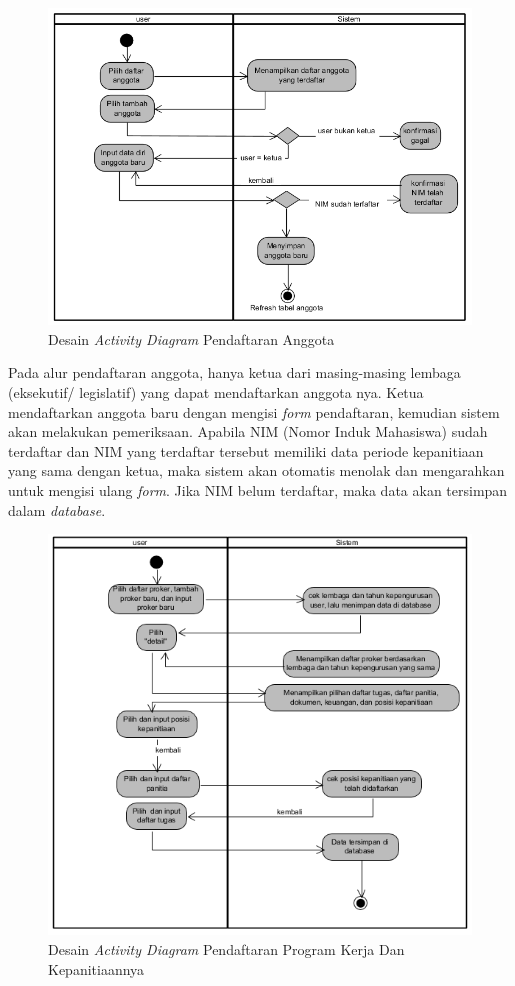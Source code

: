 \begin{figure}[H]
	\centering
	\includegraphics[width=1.0\textwidth]{gambar/Activitytambahanggota}
	\caption{Desain \emph{Activity Diagram} Pendaftaran Anggota}
	\label{activityAnggota_diagram}
\end{figure}

Pada alur pendaftaran anggota, hanya ketua dari masing-masing lembaga (eksekutif/ legislatif) yang dapat mendaftarkan anggota nya. Ketua mendaftarkan anggota baru dengan mengisi \textit{form} pendaftaran, kemudian sistem akan melakukan pemeriksaan. Apabila NIM (Nomor Induk Mahasiswa) sudah terdaftar dan NIM yang terdaftar tersebut memiliki data periode kepanitiaan yang sama dengan ketua, maka sistem akan otomatis menolak dan mengarahkan untuk mengisi ulang \textit{form}. Jika NIM belum terdaftar, maka data akan tersimpan dalam \textit{database}.


\begin{figure}[H]
	\centering
	\includegraphics[width=1.0\textwidth]{gambar/Activityproker}
	\caption{Desain \textit{Activity Diagram} Pendaftaran Program Kerja Dan Kepanitiaannya}
	\label{activityProker_diagram}
\end{figure}

